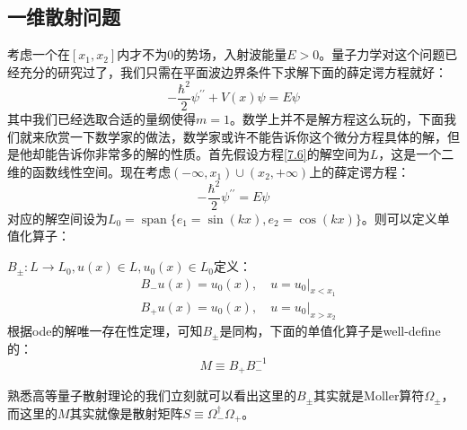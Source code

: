 \subsection{一维散射问题}
考虑一个在$[x_1,x_2]$内才不为0的势场，入射波能量$E>0$。量子力学对这个问题已经充分的研究过了，我们只需在平面波边界条件下求解下面的薛定谔方程就好：
\begin{equation}\label{7.6}
	-\frac{\hbar^2}{2}\psi^{\prime\prime}+V(x)\psi= E\psi
\end{equation}
其中我们已经选取合适的量纲使得$m=1$。数学上并不是解方程这么玩的，下面我们就来欣赏一下数学家的做法，数学家或许不能告诉你这个微分方程具体的解，但是他却能告诉你非常多的解的性质。首先假设方程\ref{7.6}的解空间为$L$，这是一个二维的函数线性空间。现在考虑$(-\infty,x_1)\cup(x_2,+\infty)$上的薛定谔方程：
\begin{equation}\label{7.7}
	-\frac{\hbar^2}{2}\psi^{\prime\prime}= E\psi
\end{equation}
对应的解空间设为$L_0=\operatorname{span}\{e_1=\sin(kx),e_2=\cos(kx)\}$。则可以定义单值化算子：
\begin{definition}[单值化算子]
	$B_{\pm}:L\to L_0,u(x)\in L,u_0(x)\in L_0$定义：
	\begin{equation}
		\begin{aligned}
			&B_- u (x)=u_0(x),\quad \left.u=u_0\right|_{x<x_1}\\
			&B_+ u (x)=u_0(x),\quad \left.u=u_0\right|_{x>x_2}
		\end{aligned}
	\end{equation}
	根据ode的解唯一存在性定理，可知$B_{\pm}$是同构，下面的单值化算子是well-define的：
	\begin{equation}
		M\equiv B_+B_-^{-1}
	\end{equation}
\end{definition}
熟悉高等量子散射理论的我们立刻就可以看出这里的$B_{\pm}$其实就是Moller算符$\Omega_{\pm}$，而这里的$M$其实就像是散射矩阵$S\equiv\Omega_-^\dagger\Omega_+$。

